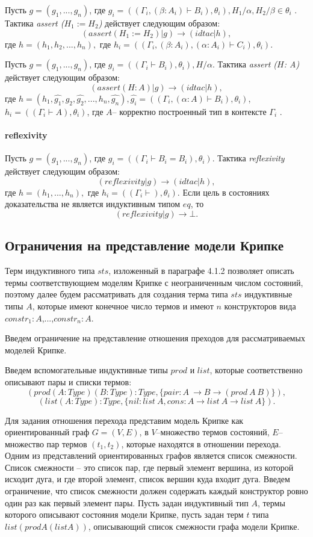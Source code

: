 \documentclass[12pt]{article}
\begin{document}
Пусть $g = (g_1, ..., g_n)$, где $g_i = ((\Gamma_i, (\beta:A_i) \vdash B_i), \theta_i), H_1/\alpha, H_2/\beta \in \theta_i$ .
Тактика \textit{assert ($H_1:=H_2$)}  действует следующим образом:
$$(assert (H_1:=H_2)|g) \xrightarrow{} (idtac| h),$$ 
где $h=(h_1,h_2,...,h_n),$ где $h_i= ((\Gamma_i, (\beta: A_i),(\alpha: A_i) \vdash C_i), \theta_i)$.


Пусть $g = (g_1, ..., g_n)$, где $g_i = ((\Gamma_i \vdash B_i), \theta_i), H/\alpha$.
Тактика \textit{assert ($H$: A)}  действует следующим образом:
$$(assert (H:A)|g) \xrightarrow{} (idtac| h),$$ 
где $h=(h_1,\hat{g_1},g_2,\hat{g_2},...,h_n,\hat{g_n}), \hat{g_i} = ((\Gamma_i, (\alpha:A) \vdash B_i), \theta_i)$,${h_i} = ((\Gamma_i \vdash A), \theta_i)$, где $A$-- корректно построенный тип в контексте $\Gamma_i$ .

\paragraph{reflexivity}
Пусть $g = (g_1, ..., g_n)$, где $g_i = ((\Gamma_i \vdash B_i=B_i), \theta_i)$.
Тактика \textit{reflexivity}  действует следующим образом:
$$(reflexivity|g) \xrightarrow{} (idtac| h),$$ 
где $h=(h_1, ...,h_n),$ где $h_i= ((\Gamma_i \vdash), \theta_i)$.
Если цель в состояниях доказательства не является индуктивным типом $eq$, то 
$$(reflexivity|g) \xrightarrow{} \bot.$$ 


\subsection{Ограничения на представление модели Крипке}
Терм индуктивного типа $sts$, изложенный в параграфе 4.1.2 позволяет описать термы соответствующием моделям Крипке с неограниченным числом состояний, поэтому далее будем рассматривать для создания терма типа $sts$ индуктивные типы $A$, которые имеют конечное число термов и имеют $n$ конструкторов вида $constr_1:A$,...,$constr_n:A$. 

Введем ограничение на представление отношения преходов для рассматриваемых моделей Крипке.

Введем вспомогательные индуктивные типы $prod$ и $list$, которые соответственно описывают пары и списки термов:
$$(prod (A:Type) (B:Type):Type, \{ pair:A\ \xrightarrow{} B \xrightarrow{} (prod\ A\ B)\}),$$
$$(list (A : Type) : Type, \{ nil : list\ A, cons : A \xrightarrow{} list\ A \xrightarrow{} list\ A \}).$$

Для задания отношения перехода представим модель Крипке как ориентированный граф $G = (V, E)$, в $V$--множество термов состояний, $E$--множество пар термов $(t_1,t_2)$, которые находятся в отношении перехода. Одним из представлений ориентированных графов является список смежности. Список смежности -- это список пар, где первый элемент вершина, из которой исходит дуга, и где второй элемент, список вершин куда входит дуга. Введем ограничение, что список смежности должен содержать каждый конструктор ровно один раз как первый элемент пары. Пусть задан индуктивный тип $A$, термы которого описывают состояния модели Крипке, пусть задан терм $t$ типа $list (prod A (list A))$, описывающий список смежности графа модели Крипке.
\end{document}
